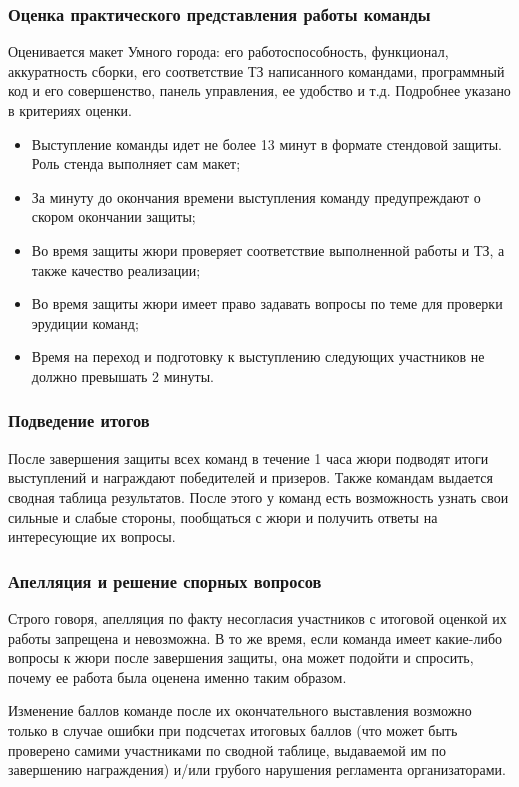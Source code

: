 \subsubsection*{Оценка практического представления работы команды}

Оценивается макет Умного города: его работоспособность, функционал, аккуратность сборки, его соответствие ТЗ написанного командами, программный код и его совершенство, панель управления, ее удобство и т.д. Подробнее указано в критериях оценки.
\begin{itemize}
    \item Выступление команды идет не более 13 минут в формате стендовой защиты. Роль стенда выполняет сам макет;
    \item За минуту до окончания времени выступления команду предупреждают о скором окончании защиты;
    \item Во время защиты жюри проверяет соответствие выполненной работы и ТЗ, а также качество реализации;
    \item Во время защиты жюри имеет право задавать вопросы по теме для проверки эрудиции команд;
    \item Время на переход и подготовку к выступлению следующих участников не должно превышать 2 минуты.         
\end{itemize}

\subsubsection*{Подведение итогов}

После завершения защиты всех команд в течение 1 часа жюри подводят итоги выступлений и награждают победителей и призеров. Также командам выдается сводная таблица результатов. После этого у команд есть возможность узнать свои сильные и слабые стороны, пообщаться с жюри и получить ответы на интересующие их вопросы.

\subsubsection*{Апелляция и решение спорных вопросов}

Строго говоря, апелляция по факту несогласия участников с итоговой оценкой их работы запрещена и невозможна. В то же время, если команда имеет какие-либо вопросы к жюри после завершения защиты, она может подойти и спросить, почему ее работа была оценена именно таким образом.

Изменение баллов команде после их окончательного выставления возможно только в случае ошибки при подсчетах итоговых баллов (что может быть проверено самими участниками по сводной таблице, выдаваемой им по завершению награждения) и/или грубого нарушения регламента организаторами.
